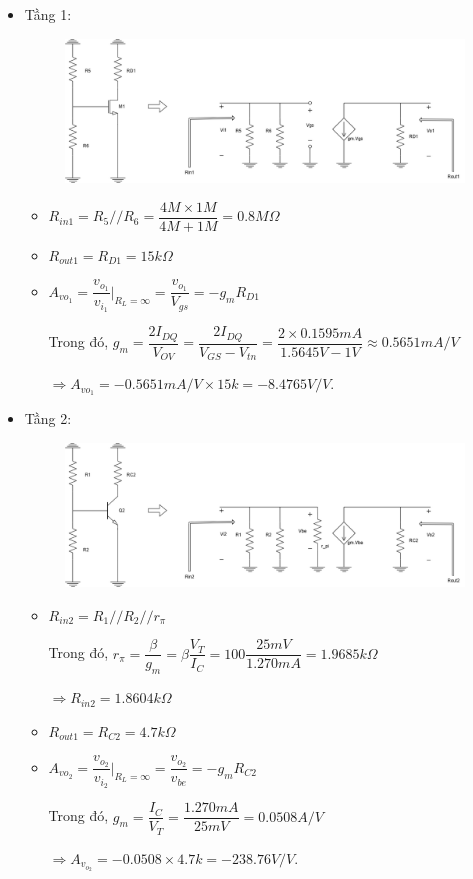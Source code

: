 \begin{itemize}[label=-]
	\item Tầng 1:
	
	\begin{figure}[H]
		\centering
		\includegraphics[width=.7\linewidth]{./my-chapters/my-diagrams/Question6/caub_stage1.png}
	\end{figure}
	
	\begin{itemize}[label = +]
		\item $R_{in1} = R_{5} // R_{6} = \dfrac{4M \times 1M}{4M + 1M} = 0.8M \Omega$
		\item $R_{out1} = R_{D1} = 15k \Omega$
		\item $A_{vo_{1}} = \dfrac{v_{o_{1}}}{v_{i_{1}}}|_{R_{L} = \infty} = \dfrac{v_{o_{1}}}{V_{gs}} = -g_{m} R_{D1}$
		
		Trong đó, $g_{m} = \dfrac{2I_{DQ}}{V_{OV}} = \dfrac{2I_{DQ}}{V_{GS} - V_{tn}} = \dfrac{2\times 0.1595mA}{1.5645V - 1V} \approx 0.5651 mA/V$
		
		$\Rightarrow A_{vo_{1}} = -0.5651 mA/V \times 15k = -8.4765 V/V $.
	\end{itemize}
	
	\item Tầng 2:
	
	\begin{figure}[H]
		\centering
		\includegraphics[width=.7\linewidth]{./my-chapters/my-diagrams/Question6/caub_stage2.png}
	\end{figure}
	
	\begin{itemize}[label = +]
		\item $R_{in2} = R_{1} // R_{2} // r_{\pi}$
		
		Trong đó, $r_{\pi} = \dfrac{\beta}{g_{m}} = \beta \dfrac{V_{T}}{I_{C}} = 100 \dfrac{25mV}{1.270mA} = 1.9685k\Omega$
		
		$\Rightarrow R_{in2} = 1.8604k\Omega$
		\item $R_{out1} = R_{C2} = 4.7k \Omega$
		\item $A_{vo_{2}} = \dfrac{v_{o_{2}}}{v_{i_{2}}}|_{R_{L} = \infty} = \dfrac{v_{o_{2}}}{v_{be}} = -g_{m}R_{C2}$
		
		Trong đó, $g_{m} = \dfrac{I_{C}}{V_{T}} = \dfrac{1.270mA}{25mV} = 0.0508 A/V$
		
		$\Rightarrow A_{v_{o_{2}}} = -0.0508\times 4.7k = -238.76 V/V$.
	\end{itemize}
\end{itemize}